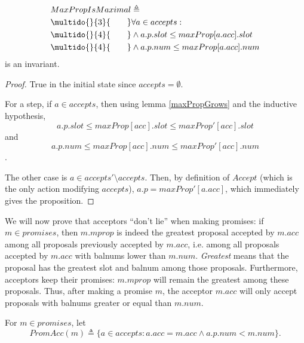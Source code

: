 \documentclass[12pt,a4paper,en]{pracamgr}
\newcommand{\ti}[1]{\textit{#1}}
\newcommand{\ind}[1]{\multido{}{#1}{\qquad}}
\begin{document}
\begin{lemma}
    \begin{align*}
        & MaxPropIsMaximal \triangleq \\
        & \ind{3} \forall a \in accepts:\\
        & \ind{4} \land a.p.slot \le maxProp[a.acc].slot\\
        & \ind{4} \land a.p.num \le maxProp[a.acc].num
    \end{align*}
    is an invariant.
\end{lemma}
\begin{proof}
    True in the initial state since $accepts = \emptyset$.

    For a step, if $a \in accepts$, then using lemma \ref{maxPropGrows} and the inductive hypothesis,
    $$a.p.slot \le maxProp[acc].slot \le maxProp'[acc].slot$$
    and
    $$a.p.num \le maxProp[acc].num \le maxProp'[acc].num$$.

    The other case is $a \in accepts' \setminus accepts$. Then, by definition of $Accept$ (which is the only action modifying $accepts$), $a.p = maxProp'[a.acc]$, which immediately gives the proposition.
\end{proof}

We will now prove that acceptors ``don't lie'' when making promises: if $m \in promises$, then $m.mprop$ is indeed the greatest proposal accepted by $m.acc$ among all proposals previously accepted by $m.acc$, i.e. among all proposals accepted by $m.acc$ with balnums lower than $m.num$. \ti{Greatest} means that the proposal has the greatest slot and balnum among those proposals. Furthermore, acceptors keep their promises: $m.mprop$ will remain the greatest among these proposals. Thus, after making a promise $m$, the acceptor $m.acc$ will only accept proposals with balnums greater or equal than $m.num$.

For $m \in promises$, let
$$ PromAcc(m) \triangleq \{a \in accepts: a.acc = m.acc \land a.p.num < m.num \}. $$
\end{document}
